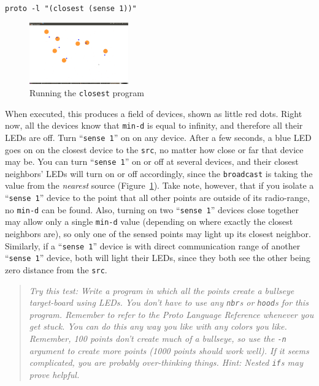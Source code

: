 \documentclass{article}
\newcommand\code[1]{\begin{center}\var{#1}\end{center}}
\newcommand\problem[1]{\begin{quote}{\em #1}\end{quote}}
\newcommand\var[1]{{\tt #1}}
\newcommand\qvar[1]{``{\tt #1}''}
\begin{document}
\code{proto -l "(closest (sense 1))"}

\begin{figure}
  \vspace{-0.8cm}
  \includegraphics[width=0.38\textwidth]{figures/closest.png}
  \caption{Running the \var{closest} program}
  \vspace{-0.5cm}
  \label{f:closest}
\end{figure}

When executed, this produces a field of devices, shown as little red
dots.  Right now, all the devices know that \var{min-d} is equal to
infinity, and therefore all their LEDs are off.  Turn \qvar{sense 1}
on on any device.  After a few seconds, a blue LED goes on on the
closest device to the \var{src}, no matter how close or far that
device may be.  You can turn \qvar{sense 1} on or off at several
devices, and their closest neighbors' LEDs will turn on or off
accordingly, since the \var{broadcast} is taking the value from the
{\em nearest} source (Figure~\ref{f:closest}).  Take note, however,
that if you isolate a \qvar{sense 1} device to the point that all
other points are outside of its radio-range, no \var{min-d} can be
found.  Also, turning on two \qvar{sense 1} devices close together may
allow only a single \var{min-d} value (depending on where exactly the
closest neighbors are), so only one of the sensed points may light up
its closest neighbor.  Similarly, if a \qvar{sense 1} device is with
direct communication range of another \qvar{sense 1} device, both will
light their LEDs, since they both see the other being zero distance
from the \var{src}.

\problem{Try this test: Write a program in which all the points create
  a bullseye target-board using LEDs.  You don't have to use any
  \var{nbr}s or \var{hood}s for this program.  Remember to refer to
  the Proto Language Reference whenever you get stuck.  You can do
  this any way you like with any colors you like.  Remember, 100
  points don't create much of a bullseye, so use the \var{-n} argument
  to create more points (1000 points should work well).  If it seems
  complicated, you are probably over-thinking things.  Hint: Nested
  \var{if}s may prove helpful.}
\end{document}
